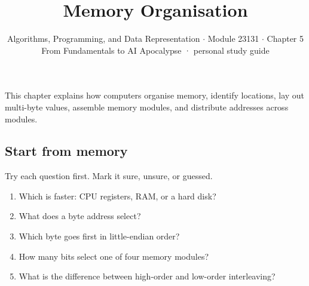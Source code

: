 \documentclass[11pt]{article}
\title{\sffamily\bfseries\color{FAUblue}Memory Organisation}
\author{Algorithms, Programming, and Data Representation \ensuremath{\cdot} Module 23131 \ensuremath{\cdot} Chapter 5\\[2pt]\small From Fundamentals to AI Apocalypse · personal study guide}
\date{}
\begin{document}
\maketitle
\begingroup\footnotesize\setlength{\parskip}{0pt}\tableofcontents\endgroup
\clearpage

{\large This chapter explains how computers organise memory, identify locations, lay out multi-byte values, assemble memory modules, and distribute addresses across modules.}


\begin{keepsection}
\section{Start from memory}

Try each question first. Mark it sure, unsure, or guessed.

\begin{enumerate}
\item Which is faster: CPU registers, RAM, or a hard disk?
\item What does a byte address select?
\item Which byte goes first in little-endian order?
\item How many bits select one of four memory modules?
\item What is the difference between high-order and low-order interleaving?
\end{enumerate}

\end{keepsection}
\end{document}
